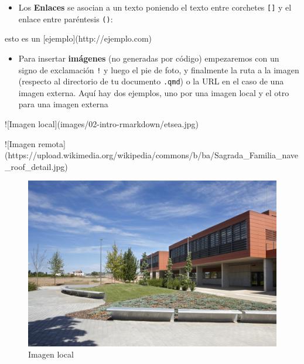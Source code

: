 \documentclass[
  letterpaper,
  DIV=11,
  numbers=noendperiod]{scrreprt}
\newenvironment{Shaded}{\begin{snugshade}}{\end{snugshade}}
\newcommand{\DecValTok}[1]{\textcolor[rgb]{0.68,0.00,0.00}{#1}}
\newcommand{\ErrorTok}[1]{\textcolor[rgb]{0.68,0.00,0.00}{#1}}
\newcommand{\NormalTok}[1]{\textcolor[rgb]{0.00,0.23,0.31}{#1}}
\newcommand{\SpecialCharTok}[1]{\textcolor[rgb]{0.37,0.37,0.37}{#1}}
\providecommand{\tightlist}{%
  \setlength{\itemsep}{0pt}\setlength{\parskip}{0pt}}\usepackage{longtable,booktabs,array}
\begin{document}
\begin{itemize}
\tightlist
\item
  Los \textbf{Enlaces} se asocian a un texto poniendo el texto entre
  corchetes \texttt{{[}{]}} y el enlace entre paréntesis \texttt{()}:
\end{itemize}

\begin{Shaded}
\begin{Highlighting}[]
\NormalTok{esto es un [ejemplo](http}\SpecialCharTok{:}\ErrorTok{//}\NormalTok{ejemplo.com)}
\end{Highlighting}
\end{Shaded}

\begin{itemize}
\tightlist
\item
  Para insertar \textbf{imágenes} (no generadas por código) empezaremos
  con un signo de exclamación \texttt{!} y luego el pie de foto, y
  finalmente la ruta a la imagen (respecto al directorio de tu documento
  \texttt{.qmd}) o la URL en el caso de una imagen externa. Aquí hay dos
  ejemplos, uno por una imagen local y el otro para una imagen externa
\end{itemize}

\begin{Shaded}
\begin{Highlighting}[]
\SpecialCharTok{!}\NormalTok{[Imagen local](images}\SpecialCharTok{/}\DecValTok{02}\SpecialCharTok{{-}}\NormalTok{intro}\SpecialCharTok{{-}}\NormalTok{rmarkdown}\SpecialCharTok{/}\NormalTok{etsea.jpg)}

\SpecialCharTok{!}\NormalTok{[Imagen remota](https}\SpecialCharTok{:}\ErrorTok{//}\NormalTok{upload.wikimedia.org}\SpecialCharTok{/}\NormalTok{wikipedia}\SpecialCharTok{/}\NormalTok{commons}\SpecialCharTok{/}\NormalTok{b}\SpecialCharTok{/}\NormalTok{ba}\SpecialCharTok{/}\NormalTok{Sagrada\_Familia\_nave\_roof\_detail.jpg)}
\end{Highlighting}
\end{Shaded}

\begin{figure}

{\centering \includegraphics{images/02-intro-rmarkdown/etsea.jpg}

}

\caption{Imagen local}

\end{figure}
\end{document}

